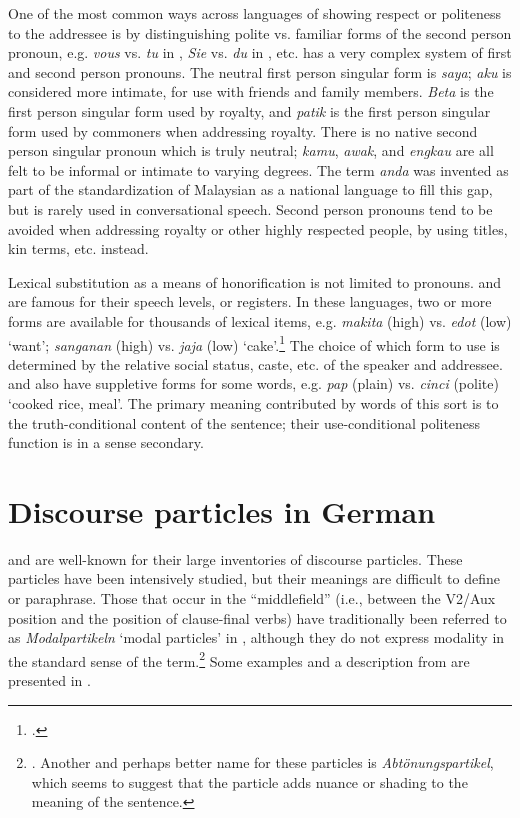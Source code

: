 One of the most common ways across languages of showing respect or politeness to the addressee is by distinguishing polite vs. familiar forms of the second person pronoun, e.g. \textit{vous} vs. \textit{tu} in , \textit{Sie} vs. \textit{du} in , etc.  has a very complex system of first and second person pronouns. The neutral first person singular form is \textit{saya}; \textit{aku} is considered more intimate, for use with friends and family members. \textit{Beta} is the first person singular form used by royalty, and \textit{patik} is the first person singular form used by commoners when addressing royalty. There is no native  second person singular pronoun which is truly neutral; \textit{kamu}, \textit{awak}, and \textit{engkau} are all felt to be informal or intimate to varying degrees. The term \textit{anda} was invented as part of the standardization of Malaysian as a national language to fill this gap, but is rarely used in conversational speech. Second person pronouns tend to be avoided when addressing royalty or other highly respected people, by using titles, kin terms, etc. instead.



Lexical substitution as a means of honorification is not limited to pronouns.  and  are famous for their speech levels, or registers. In these languages, two or more forms are available for thousands of lexical items, e.g.  \textit{makita} (high) vs. \textit{edot} (low) ‘want’; \textit{sanganan} (high) vs. \textit{jaja} (low) ‘cake’.\footnote{\citet{Arka2005}.} The choice of which form to use is determined by the relative social status, caste, etc. of the speaker and addressee.  and  also have suppletive forms for some words, e.g.  \textit{pap} (plain) vs. \textit{cinci} (polite) ‘cooked rice, meal’. The primary meaning contributed by words of this sort is to the truth-conditional content of the sentence; their use-conditional politeness function is in a sense secondary.


\section{Discourse particles in German}\label{sec:11.6}\largerpage[2]

 and  are well-known for their large inventories of discourse particles. These particles have been intensively studied, but their meanings are difficult to define or paraphrase. Those that occur in the “middlefield” (i.e., between the V2/Aux position and the position of clause-final verbs) have traditionally been referred to as \textit{Modalpartikeln} ‘modal particles’ in , although they do not express modality in the standard sense of the term.\footnote{\citet[45--46]{Palmer1986}. Another and perhaps better name for these particles is \textit{Abtönungspartikel}, which seems to suggest that the particle adds nuance or shading to the meaning of the sentence.} Some examples and a description from \citet[2013]{Zimmermann2011} are presented in .


